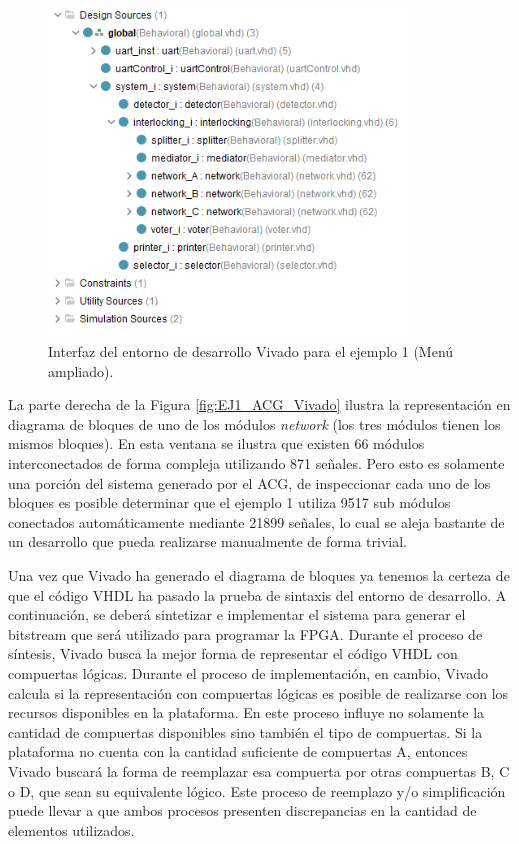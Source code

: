 	\begin{figure}[H]
		\centering
		\includegraphics[origin = c, width=0.85\textwidth]{resultados-obtenidos/ejemplo1/images/ACG_vivado_2}
		\centering\caption{Interfaz del entorno de desarrollo Vivado para el ejemplo 1 (Menú ampliado).}
		\label{fig:EJ1_ACG_Vivado_ampliado}
	\end{figure}
	
	La parte derecha de la Figura \ref{fig:EJ1_ACG_Vivado} ilustra la representación en diagrama de bloques de uno de los módulos \textit{network} (los tres módulos tienen los mismos bloques). En esta ventana se ilustra que existen 66 módulos interconectados de forma compleja utilizando 871 señales. Pero esto es solamente una porción del sistema generado por el ACG, de inspeccionar cada uno de los bloques es posible determinar que el ejemplo 1 utiliza 9517 sub módulos conectados automáticamente mediante 21899 señales, lo cual se aleja bastante de un desarrollo que pueda realizarse manualmente de forma trivial.
	
	Una vez que Vivado ha generado el diagrama de bloques ya tenemos la certeza de que el código VHDL ha pasado la prueba de sintaxis del entorno de desarrollo. A continuación, se deberá sintetizar e implementar el sistema para generar el bitstream que será utilizado para programar la FPGA. Durante el proceso de síntesis, Vivado busca la mejor forma de representar el código VHDL con compuertas lógicas. Durante el proceso de implementación, en cambio, Vivado calcula si la representación con compuertas lógicas es posible de realizarse con los recursos disponibles en la plataforma. En este proceso influye no solamente la cantidad de compuertas disponibles sino también el tipo de compuertas. Si la plataforma no cuenta con la cantidad suficiente de compuertas A, entonces Vivado buscará la forma de reemplazar esa compuerta por otras compuertas B, C o D, que sean su equivalente lógico. Este proceso de reemplazo y/o simplificación puede llevar a que ambos procesos presenten discrepancias en la cantidad de elementos utilizados. 
	
